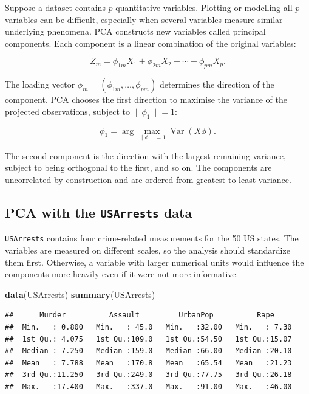 \documentclass[
  11pt,
]{article}
\newenvironment{Shaded}{\begin{snugshade}}{\end{snugshade}}
\newcommand{\FunctionTok}[1]{\textcolor[rgb]{0.13,0.29,0.53}{\textbf{#1}}}
\newcommand{\NormalTok}[1]{#1}
\begin{document}
Suppose a dataset contains \(p\) quantitative variables. Plotting or
modelling all \(p\) variables can be difficult, especially when several
variables measure similar underlying phenomena. PCA constructs new
variables called principal components. Each component is a linear
combination of the original variables:

\[
Z_m = \phi_{1m}X_1 + \phi_{2m}X_2 + \cdots + \phi_{pm}X_p.
\]

The loading vector \(\phi_m=(\phi_{1m},\ldots,\phi_{pm})\) determines
the direction of the component. PCA chooses the first direction to
maximise the variance of the projected observations, subject to
\(\|\phi_1\|=1\):

\[
\phi_1 = \arg\max_{\|\phi\|=1}
\operatorname{Var}(X\phi).
\]

The second component is the direction with the largest remaining
variance, subject to being orthogonal to the first, and so on. The
components are uncorrelated by construction and are ordered from
greatest to least variance.

\subsection{\texorpdfstring{PCA with the \texttt{USArrests}
data}{PCA with the USArrests data}}\label{pca-with-the-usarrests-data}

\texttt{USArrests} contains four crime-related measurements for the 50
US states. The variables are measured on different scales, so the
analysis should standardize them first. Otherwise, a variable with
larger numerical units would influence the components more heavily even
if it were not more informative.

\begin{Shaded}
\begin{Highlighting}[]
\FunctionTok{data}\NormalTok{(USArrests)}
\FunctionTok{summary}\NormalTok{(USArrests)}
\end{Highlighting}
\end{Shaded}

\begin{verbatim}
##      Murder          Assault         UrbanPop          Rape      
##  Min.   : 0.800   Min.   : 45.0   Min.   :32.00   Min.   : 7.30  
##  1st Qu.: 4.075   1st Qu.:109.0   1st Qu.:54.50   1st Qu.:15.07  
##  Median : 7.250   Median :159.0   Median :66.00   Median :20.10  
##  Mean   : 7.788   Mean   :170.8   Mean   :65.54   Mean   :21.23  
##  3rd Qu.:11.250   3rd Qu.:249.0   3rd Qu.:77.75   3rd Qu.:26.18  
##  Max.   :17.400   Max.   :337.0   Max.   :91.00   Max.   :46.00
\end{verbatim}
\end{document}
